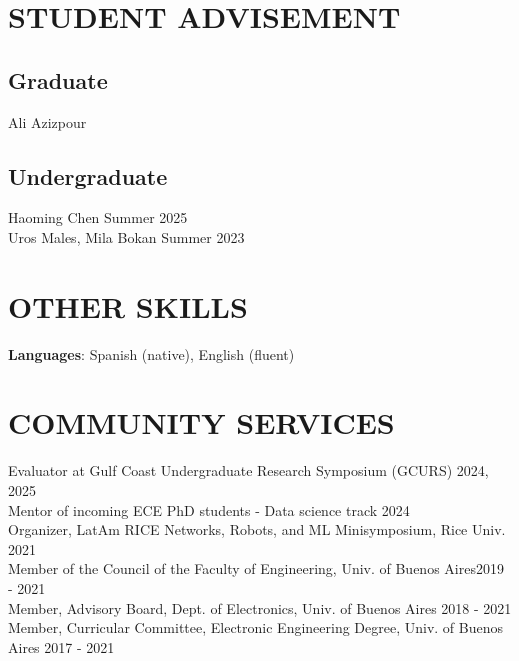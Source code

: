 \documentclass[a4paper,9pt]{extarticle}
\begin{document}

\section*{STUDENT ADVISEMENT}

\subsection*{Graduate}
Ali Azizpour

\subsection*{Undergraduate}
Haoming Chen \hfill Summer 2025\\
Uros Males, Mila Bokan \hfill Summer 2023

\section*{OTHER SKILLS}
\textbf{Languages}: Spanish (native), English (fluent)



\section*{COMMUNITY SERVICES}
Evaluator at Gulf Coast Undergraduate Research Symposium (GCURS) \hfill 2024, 2025 \\
Mentor of incoming ECE PhD students - Data science track \hfill 2024\\
Organizer, LatAm RICE Networks, Robots, and ML Minisymposium, Rice Univ. \hfill 2021\\
Member of the Council of the Faculty of Engineering, Univ. of Buenos Aires\hfill 2019 - 2021\\
Member, Advisory Board, Dept. of Electronics, Univ. of Buenos Aires \hfill 2018 - 2021\\
Member, Curricular Committee, Electronic Engineering Degree, Univ. of Buenos Aires \hfill 2017 - 2021\\
\end{document}
